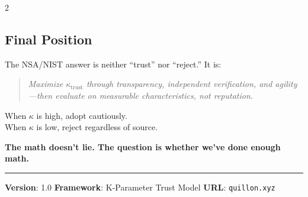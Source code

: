 \documentclass[11pt]{article}
\begin{document}
\begin{multicols}{2}
\subsection{Final Position}

The NSA/NIST answer is neither ``trust'' nor ``reject.'' It is:

\begin{quote}
\textit{Maximize $\kappa_{\text{trust}}$ through transparency, independent verification, and agility---then evaluate on measurable characteristics, not reputation.}
\end{quote}

When $\kappa$ is high, adopt cautiously.\\
When $\kappa$ is low, reject regardless of source.

\textbf{The math doesn't lie. The question is whether we've done enough math.}

\end{multicols}

\vspace{1em}
\hrule
\vspace{0.5em}
\small
\noindent\textbf{Version}: 1.0 \hfill \textbf{Framework}: K-Parameter Trust Model \hfill \textbf{URL}: \texttt{quillon.xyz}
\end{document}
